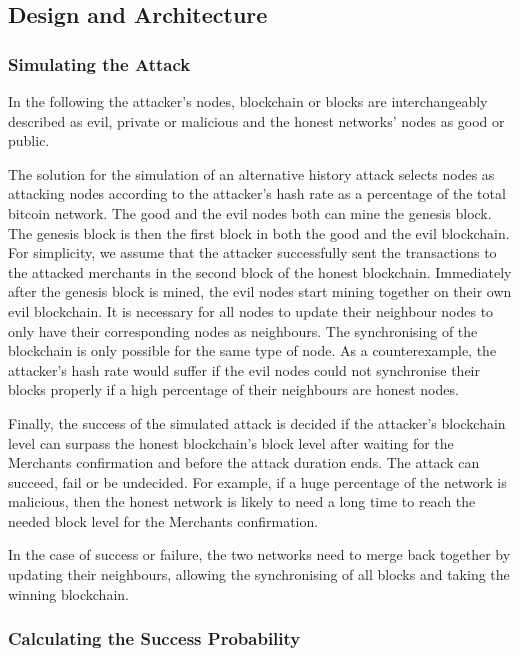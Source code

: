 \subsection{Design and Architecture}

\subsubsection{Simulating the Attack}

In the following the attacker's nodes, blockchain or blocks are interchangeably described as evil, private or malicious and the honest networks' nodes as good or public.

The solution for the simulation of an alternative history attack selects nodes as attacking nodes according to the attacker's hash rate as a percentage of the total bitcoin network.
The good and the evil nodes both can mine the genesis block. The genesis block is then the first block in both the good and the evil blockchain. For simplicity, we assume that the attacker successfully sent the transactions to the attacked merchants in the second block of the honest blockchain. Immediately after the genesis block is mined, the evil nodes start mining together on their own evil blockchain. It is necessary for all nodes to update their neighbour nodes to only have their corresponding nodes as neighbours. The synchronising of the blockchain is only possible for the same type of node. As a counterexample, the attacker's hash rate would suffer if the evil nodes could not synchronise their blocks properly if a high percentage of their neighbours are honest nodes.

Finally, the success of the simulated attack is decided if the attacker's blockchain level can surpass the honest blockchain's block level after waiting for the Merchants confirmation and before the attack duration ends. The attack can succeed, fail or be undecided. For example, if a huge percentage of the network is malicious, then the honest network is likely to need a long time to reach the needed block level for the Merchants confirmation.

In the case of success or failure, the two networks need to merge back together by updating their neighbours, allowing the synchronising of all blocks and taking the winning blockchain.

\subsubsection{Calculating the Success Probability}

